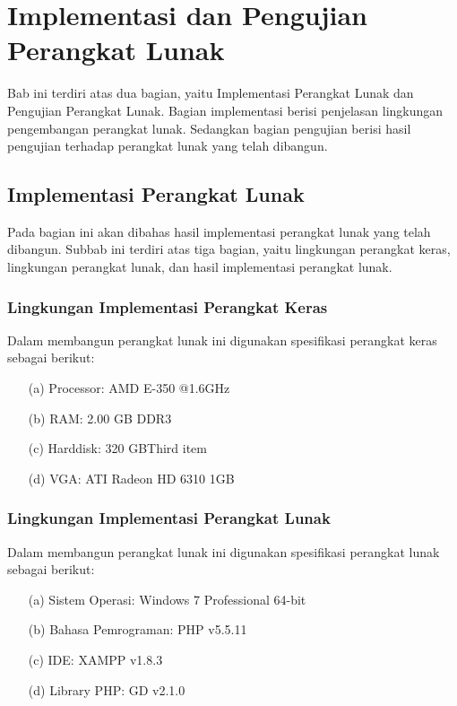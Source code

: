 \chapter{Implementasi dan Pengujian Perangkat Lunak}
\label{chap:implementasidanpengujian}

Bab ini terdiri atas dua bagian, yaitu Implementasi Perangkat Lunak dan Pengujian Perangkat Lunak. Bagian implementasi berisi penjelasan lingkungan pengembangan perangkat lunak. Sedangkan bagian pengujian berisi hasil pengujian terhadap perangkat lunak yang telah dibangun.

\section{Implementasi Perangkat Lunak}
\label{sec:implementasiperangkatlunak}

Pada bagian ini akan dibahas hasil implementasi perangkat lunak yang telah dibangun. Subbab ini terdiri atas tiga bagian, yaitu lingkungan perangkat keras, lingkungan perangkat lunak, dan hasil implementasi perangkat lunak.

\subsection{Lingkungan Implementasi Perangkat Keras}
\label{sec:lingkunganimplementasiperangkatkeras}

Dalam membangun perangkat lunak ini digunakan spesifikasi perangkat keras sebagai berikut:

\begin{enumerate}
\item[(a)] Processor: AMD E-350 @1.6GHz
\item[(b)] RAM: 2.00 GB DDR3
\item[(c)] Harddisk: 320 GBThird item
\item[(d)] VGA: ATI Radeon HD 6310 1GB
\end{enumerate}

\subsection{Lingkungan Implementasi Perangkat Lunak}
\label{sec:lingkunganimplementasiperangkatlunak}

Dalam membangun perangkat lunak ini digunakan spesifikasi perangkat lunak sebagai berikut:

\begin{enumerate}
\item[(a)] Sistem Operasi: Windows 7 Professional 64-bit
\item[(b)] Bahasa Pemrograman: PHP v5.5.11
\item[(c)] IDE: XAMPP v1.8.3
\item[(d)] Library PHP: GD v2.1.0
\end{enumerate}

